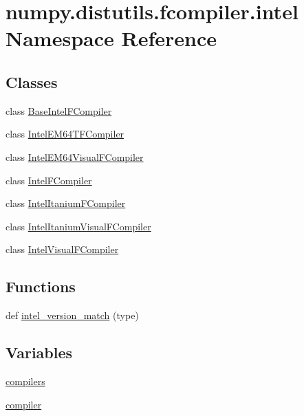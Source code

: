 \hypertarget{namespacenumpy_1_1distutils_1_1fcompiler_1_1intel}{}\section{numpy.\+distutils.\+fcompiler.\+intel Namespace Reference}
\label{namespacenumpy_1_1distutils_1_1fcompiler_1_1intel}
\subsection*{Classes}
\begin{DoxyCompactItemize}
\item 
class \hyperlink{classnumpy_1_1distutils_1_1fcompiler_1_1intel_1_1BaseIntelFCompiler}{Base\+Intel\+F\+Compiler}
\item 
class \hyperlink{classnumpy_1_1distutils_1_1fcompiler_1_1intel_1_1IntelEM64TFCompiler}{Intel\+E\+M64\+T\+F\+Compiler}
\item 
class \hyperlink{classnumpy_1_1distutils_1_1fcompiler_1_1intel_1_1IntelEM64VisualFCompiler}{Intel\+E\+M64\+Visual\+F\+Compiler}
\item 
class \hyperlink{classnumpy_1_1distutils_1_1fcompiler_1_1intel_1_1IntelFCompiler}{Intel\+F\+Compiler}
\item 
class \hyperlink{classnumpy_1_1distutils_1_1fcompiler_1_1intel_1_1IntelItaniumFCompiler}{Intel\+Itanium\+F\+Compiler}
\item 
class \hyperlink{classnumpy_1_1distutils_1_1fcompiler_1_1intel_1_1IntelItaniumVisualFCompiler}{Intel\+Itanium\+Visual\+F\+Compiler}
\item 
class \hyperlink{classnumpy_1_1distutils_1_1fcompiler_1_1intel_1_1IntelVisualFCompiler}{Intel\+Visual\+F\+Compiler}
\end{DoxyCompactItemize}
\subsection*{Functions}
\begin{DoxyCompactItemize}
\item 
def \hyperlink{namespacenumpy_1_1distutils_1_1fcompiler_1_1intel_ade939322f0edce1e1b49980d1a9d8b46}{intel\+\_\+version\+\_\+match} (type)
\end{DoxyCompactItemize}
\subsection*{Variables}
\begin{DoxyCompactItemize}
\item 
\hyperlink{namespacenumpy_1_1distutils_1_1fcompiler_1_1intel_a585c27adb3cccdac0f5385f5414a20f5}{compilers}
\item 
\hyperlink{namespacenumpy_1_1distutils_1_1fcompiler_1_1intel_a19da0753635010454eb32d4ab4ad6b8c}{compiler}
\end{DoxyCompactItemize}



